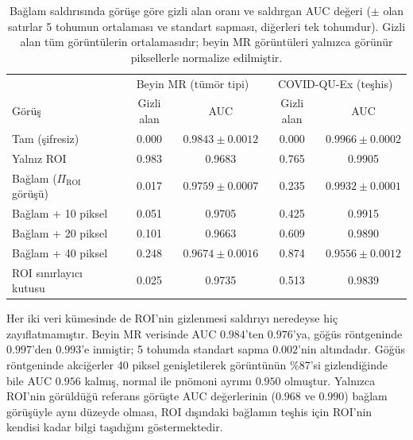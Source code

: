 \begin{table}[h!]
{\setlength{\tabcolsep}{4pt}
\caption{Bağlam saldırısında görüşe göre gizli alan oranı ve saldırgan AUC değeri ($\pm$ olan satırlar 5 tohumun ortalaması ve standart sapması, diğerleri tek tohumdur). Gizli alan tüm görüntülerin ortalamasıdır; beyin MR görüntüleri yalnızca görünür piksellerle normalize edilmiştir.}
\begin{center}
\vspace{-6mm}
{\small
\begin{tabular}{lcccc}
\hline\hline
& \multicolumn{2}{c}{Beyin MR (tümör tipi)} & \multicolumn{2}{c}{COVID-QU-Ex (teşhis)} \\
Görüş & Gizli alan & AUC & Gizli alan & AUC \\
\hline
Tam (şifresiz) & 0.000 & $0.9843 \pm 0.0012$ & 0.000 & $0.9966 \pm 0.0002$ \\
Yalnız ROI & 0.983 & 0.9683 & 0.765 & 0.9905 \\
Bağlam ($\Pi_{\mathrm{ROI}}$ görüşü) & 0.017 & $0.9759 \pm 0.0007$ & 0.235 & $0.9932 \pm 0.0001$ \\
Bağlam + 10 piksel & 0.051 & 0.9705 & 0.425 & 0.9915 \\
Bağlam + 20 piksel & 0.101 & 0.9663 & 0.609 & 0.9890 \\
Bağlam + 40 piksel & 0.248 & $0.9674 \pm 0.0016$ & 0.874 & $0.9556 \pm 0.0012$ \\
ROI sınırlayıcı kutusu & 0.025 & 0.9735 & 0.513 & 0.9839 \\
\hline
\end{tabular}}
\vspace{-6mm}
\end{center}
\label{tbl:saldiriB}}
\end{table}

Her iki veri kümesinde de ROI'nin gizlenmesi saldırıyı neredeyse hiç zayıflatmamıştır. Beyin MR verisinde AUC $0.984$'ten $0.976$'ya, göğüs röntgeninde $0.997$'den $0.993$'e inmiştir; 5 tohumda standart sapma $0.002$'nin altındadır. Göğüs röntgeninde akciğerler 40 piksel genişletilerek görüntünün \%87'si gizlendiğinde bile AUC $0.956$ kalmış, normal ile pnömoni ayrımı $0.950$ olmuştur. Yalnızca ROI'nin görüldüğü referans görüşte AUC değerlerinin ($0.968$ ve $0.990$) bağlam görüşüyle aynı düzeyde olması, ROI dışındaki bağlamın teşhis için ROI'nin kendisi kadar bilgi taşıdığını göstermektedir.


